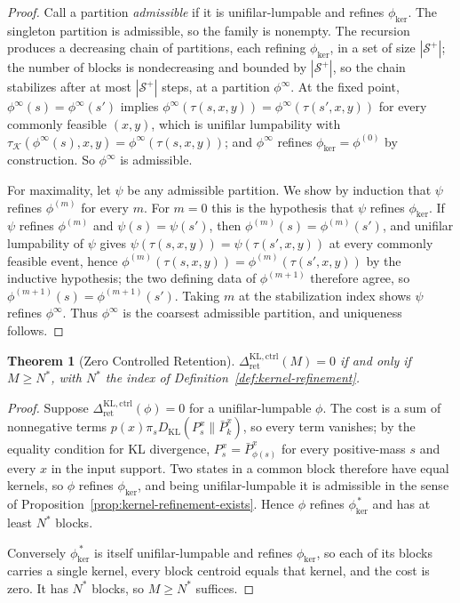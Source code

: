 \documentclass[12pt]{article}
\newtheorem{theorem}{Theorem}[section]
\theoremstyle{definition}
\newcommand{\Splus}{\mathcal S^{+}}
\newcommand{\RetKLc}{\Delta_{\mathrm{ret}}^{\mathrm{KL,ctrl}}}
\begin{document}
\begin{proof}
Call a partition \emph{admissible} if it is unifilar-lumpable and refines
$\phi_{\ker}$.  The singleton partition is admissible, so the family is
nonempty.  The recursion produces a decreasing chain of partitions, each
refining $\phi_{\ker}$, in a set of size $|\Splus|$; the number of blocks is
nondecreasing and bounded by $|\Splus|$, so the chain stabilizes after at most
$|\Splus|$ steps, at a partition $\phi^{\infty}$.  At the fixed point,
$\phi^{\infty}(s)=\phi^{\infty}(s')$ implies
$\phi^{\infty}(\tau(s,x,y))=\phi^{\infty}(\tau(s',x,y))$ for every commonly
feasible $(x,y)$, which is unifilar lumpability with
$\tau_{\mathcal K}(\phi^{\infty}(s),x,y)=\phi^{\infty}(\tau(s,x,y))$; and
$\phi^{\infty}$ refines $\phi_{\ker}=\phi^{(0)}$ by construction.  So
$\phi^{\infty}$ is admissible.

For maximality, let $\psi$ be any admissible partition.  We show by induction
that $\psi$ refines $\phi^{(m)}$ for every $m$.  For $m=0$ this is the
hypothesis that $\psi$ refines $\phi_{\ker}$.  If $\psi$ refines $\phi^{(m)}$
and $\psi(s)=\psi(s')$, then $\phi^{(m)}(s)=\phi^{(m)}(s')$, and unifilar
lumpability of $\psi$ gives $\psi(\tau(s,x,y))=\psi(\tau(s',x,y))$ at every
commonly feasible event, hence
$\phi^{(m)}(\tau(s,x,y))=\phi^{(m)}(\tau(s',x,y))$ by the inductive
hypothesis; the two defining data of $\phi^{(m+1)}$ therefore agree, so
$\phi^{(m+1)}(s)=\phi^{(m+1)}(s')$.  Taking $m$ at the stabilization index
shows $\psi$ refines $\phi^{\infty}$.  Thus $\phi^{\infty}$ is the coarsest
admissible partition, and uniqueness follows.
\end{proof}

\begin{theorem}[Zero Controlled Retention]
\label{thm:controlled-zero}
$\RetKLc(M)=0$ if and only if $M\ge N^{\ast}$, with $N^{\ast}$
the index of Definition~\ref{def:kernel-refinement}.
\end{theorem}

\begin{proof}
Suppose $\RetKLc(\phi)=0$ for a unifilar-lumpable $\phi$.  The
cost is a sum of nonnegative terms $p(x)\pi_sD_{\mathrm{KL}}(P_s^x\|\bar P_k^x)$,
so every term vanishes; by the equality condition for KL divergence,
$P_s^x=\bar P_{\phi(s)}^x$ for every positive-mass $s$ and every $x$ in the
input support.  Two states in a common block therefore have equal kernels, so
$\phi$ refines $\phi_{\ker}$, and being unifilar-lumpable it is admissible in
the sense of Proposition~\ref{prop:kernel-refinement-exists}.  Hence $\phi$
refines $\phi_{\ker}^{\,\ast}$ and has at least $N^{\ast}$ blocks.

Conversely $\phi_{\ker}^{\,\ast}$ is itself unifilar-lumpable and refines
$\phi_{\ker}$, so each of its blocks carries a single kernel, every block
centroid equals that kernel, and the cost is zero.  It has $N^{\ast}$ blocks,
so $M\ge N^{\ast}$ suffices.
\end{proof}
\end{document}
